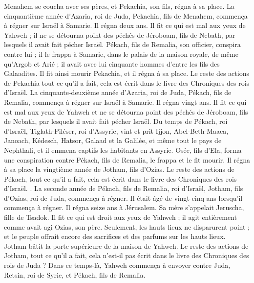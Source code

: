 \begin{multicols}{2}
Menahem se coucha avec ses pères, et Pekachia, son fils, régna à sa place.
La cinquantième année d'Azaria, roi de Juda, Pekachia, fils de Menahem, commença à régner sur Israël à Samarie. Il régna deux ans.
Il fit ce qui est mal aux yeux de Yahweh ; il ne se détourna point des péchés de Jéroboam, fils de Nebath, par lesquels il avait fait pécher Israël.
Pékach, fils de Remalia, son officier, conspira contre lui ; il le frappa à Samarie, dans le palais de la maison royale, de même qu'Argob et Arié ; il avait avec lui cinquante hommes d'entre les fils des Galaadites. Il fit ainsi mourir Pekachia, et il régna à sa place.
Le reste des actions de Pekachia tout ce qu'il a fait, cela est écrit dans le livre des Chroniques des rois d'Israël.
La cinquante-deuxième année d'Azaria, roi de Juda, Pékach, fils de Remalia, commença à régner sur Israël à Samarie. Il régna vingt ans.
Il fit ce qui est mal aux yeux de Yahweh et ne se détourna point des péchés de Jéroboam, fils de Nebath, par lesquels il avait fait pécher Israël.
Du temps de Pékach, roi d'Israël, Tiglath-Piléser, roi d'Assyrie, vint et prit Ijjon, Abel-Beth-Maaca, Janoach, Kédesch, Hatsor, Galaad et la Galilée, et même tout le pays de Nephthali, et il emmena captifs les habitants en Assyrie.
Osée, fils d'Ela, forma une conspiration contre Pékach, fils de Remalia, le frappa et le fit mourir. Il régna à sa place la vingtième année de Jotham, fils d'Ozias.
Le reste des actions de Pékach, tout ce qu'il a fait, cela est écrit dans le livre des Chroniques des rois d'Israël.
.
La seconde année de Pékach, fils de Remalia, roi d'Israël, Jotham, fils d'Ozias, roi de Juda, commença à régner.
Il était âgé de vingt-cinq ans lorsqu'il commença à régner. Il régna seize ans à Jérusalem. Sa mère s'appelait Jeruscha, fille de Tsadok.
Il fit ce qui est droit aux yeux de Yahweh ; il agit entièrement comme avait agi Ozias, son père.
Seulement, les hauts lieux ne disparurent point ; et le peuple offrait encore des sacrifices et des parfums sur les hauts lieux. Jotham bâtit la porte supérieure de la maison de Yahweh.
Le reste des actions de Jotham, tout ce qu'il a fait, cela n'est-il pas écrit dans le livre des Chroniques des rois de Juda ?
Dans ce temps-là, Yahweh commença à envoyer contre Juda, Retsin, roi de Syrie, et Pékach, fils de Remalia.

\end{multicols}
